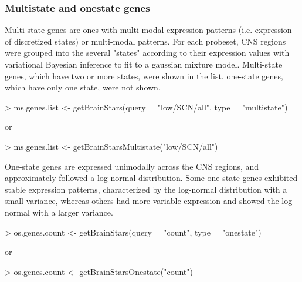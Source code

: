 \documentclass[12pt,fullpage]{article}
\begin{document}
\subsubsection{Multistate and onestate genes}
Multi-state genes are ones with multi-modal expression patterns (i.e. expression of discretized states) or multi-modal patterns. For each probeset, CNS regions were grouped into the several "states" according to their expression values with variational Bayesian inference to fit to a gaussian mixture model. Multi-state genes, which have two or more states, were shown in the list. one-state genes, which have only one state, were not shown.
\begin{Schunk}
\begin{Sinput}
> ms.genes.list <- getBrainStars(query = "low/SCN/all", type = "multistate")
\end{Sinput}
\end{Schunk}
or
\begin{Schunk}
\begin{Sinput}
> ms.genes.list <- getBrainStarsMultistate("low/SCN/all")
\end{Sinput}
\end{Schunk}

One-state genes are expressed unimodally across the CNS regions, and approximately followed a log-normal distribution. Some one-state genes exhibited stable expression patterns, characterized by the log-normal distribution with a small variance, whereas others had more variable expression and showed the log-normal with a larger variance.
\begin{Schunk}
\begin{Sinput}
> os.genes.count <- getBrainStars(query = "count", type = "onestate")
\end{Sinput}
\end{Schunk}
or
\begin{Schunk}
\begin{Sinput}
> os.genes.count <- getBrainStarsOnestate("count")
\end{Sinput}
\end{Schunk}
\end{document}
